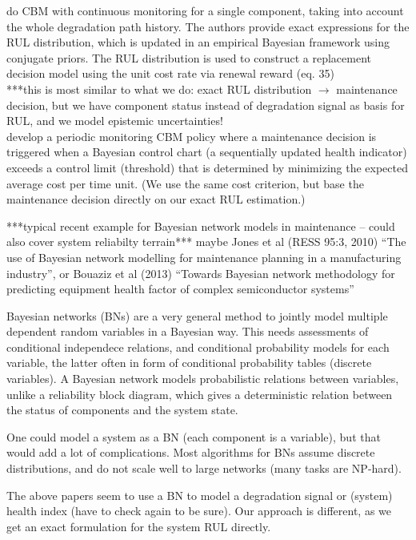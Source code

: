 \documentclass[authoryear]{elsarticle}
\begin{document}
\cite{2013:si-et-al} do CBM with continuous monitoring for a single component,
taking into account the whole degradation path history.
The authors provide exact expressions for the RUL distribution, which is updated in an empirical Bayesian framework using conjugate priors.
The RUL distribution is used to construct a replacement decision model using the unit cost rate via renewal reward
(eq. 35)\\
***this is most similar to what we do: exact RUL distribution $\to$ maintenance decision,
but we have component status instead of degradation signal as basis for RUL,
and we model epistemic uncertainties!\\

\cite{2011:kim-et-al} develop a periodic monitoring CBM policy
where a maintenance decision is triggered when
a Bayesian control chart (a sequentially updated health indicator) %
exceeds a control limit (threshold) that is determined
by minimizing the expected average cost per time unit.
(We use the same cost criterion, but base the maintenance decision directly on our exact RUL estimation.)

***typical recent example for Bayesian network models in maintenance -- could also cover system reliabilty terrain***
maybe Jones et al (RESS 95:3, 2010) ``The use of Bayesian network modelling for maintenance planning in a manufacturing industry'',
or Bouaziz et al (2013) ``Towards Bayesian network methodology for predicting equipment health factor of complex semiconductor systems''

\begin{scriptsize}
Bayesian networks (BNs) are a very general method to jointly model multiple dependent random variables in a Bayesian way. 
This needs assessments of conditional independece relations, and conditional probability models for each variable,
the latter often in form of conditional probability tables (discrete variables).
A Bayesian network models probabilistic relations between variables,
unlike a reliability block diagram, which gives a deterministic relation
between the status of components and the system state.

One could model a system as a BN (each component is a variable),
but that would add a lot of complications.
Most algorithms for BNs assume discrete distributions,
and do not scale well to large networks (many tasks are NP-hard).

The above papers seem to use a BN to model a degradation signal or (system) health index (have to check again to be sure).
Our approach is different, as we get an exact formulation for the system RUL directly.
\end{scriptsize}
\fi
\end{document}
